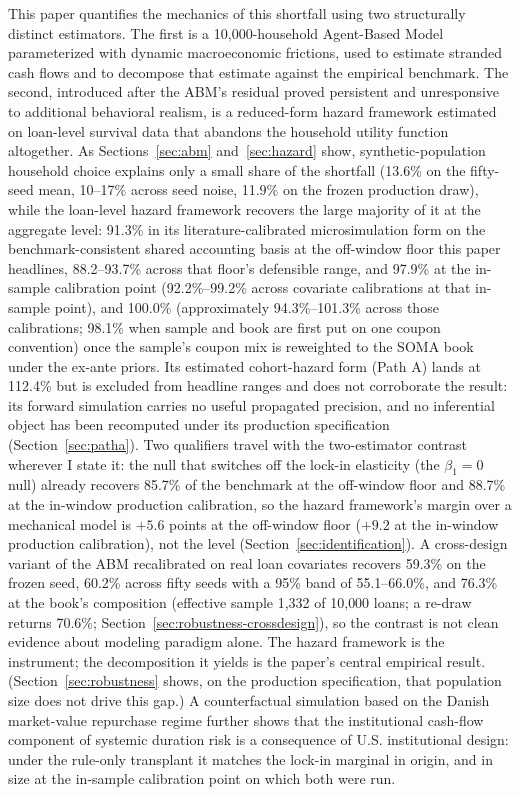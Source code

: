 \documentclass[12pt]{article}
\begin{document}
This paper quantifies the mechanics of this shortfall using two structurally distinct estimators. The first is a 10,000-household Agent-Based Model parameterized with dynamic macroeconomic frictions, used to estimate stranded cash flows and to decompose that estimate against the empirical benchmark. The second, introduced after the ABM's residual proved persistent and unresponsive to additional behavioral realism, is a reduced-form hazard framework estimated on loan-level survival data that abandons the household utility function altogether. As Sections~\ref{sec:abm} and~\ref{sec:hazard} show, synthetic-population household choice explains only a small share of the shortfall (13.6\% on the fifty-seed mean, 10--17\% across seed noise, 11.9\% on the frozen production draw), while the loan-level hazard framework recovers the large majority of it at the aggregate level: 91.3\% in its literature-calibrated microsimulation form on the benchmark-consistent shared accounting basis at the off-window floor this paper headlines, 88.2--93.7\% across that floor's defensible range, and 97.9\% at the in-sample calibration point (92.2\%--99.2\% across covariate calibrations at that in-sample point), and 100.0\% (approximately 94.3\%--101.3\% across those calibrations; 98.1\% when sample and book are first put on one coupon convention) once the sample's coupon mix is reweighted to the SOMA book under the ex-ante priors. Its estimated cohort-hazard form (Path A) lands at 112.4\% but is excluded from headline ranges and does not corroborate the result: its forward simulation carries no useful propagated precision, and no inferential object has been recomputed under its production specification (Section~\ref{sec:patha}). Two qualifiers travel with the two-estimator contrast wherever I state it: the null that switches off the lock-in elasticity (the $\beta_1 = 0$ null) already recovers 85.7\% of the benchmark at the off-window floor and 88.7\% at the in-window production calibration, so the hazard framework's margin over a mechanical model is $+5.6$ points at the off-window floor ($+9.2$ at the in-window production calibration), not the level (Section~\ref{sec:identification}). A cross-design variant of the ABM recalibrated on real loan covariates recovers 59.3\% on the frozen seed, 60.2\% across fifty seeds with a 95\% band of 55.1--66.0\%, and 76.3\% at the book's composition (effective sample 1{,}332 of 10{,}000 loans; a re-draw returns 70.6\%; Section~\ref{sec:robustness-crossdesign}), so the contrast is not clean evidence about modeling paradigm alone. The hazard framework is the instrument; the decomposition it yields is the paper's central empirical result. (Section~\ref{sec:robustness} shows, on the production specification, that population size does not drive this gap.) A counterfactual simulation based on the Danish market-value repurchase regime further shows that the institutional cash-flow component of systemic duration risk is a consequence of U.S. institutional design: under the rule-only transplant it matches the lock-in marginal in origin, and in size at the in-sample calibration point on which both were run.
\end{document}
